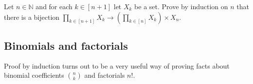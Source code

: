 \begin{exercise}
Let $n \in \mathbb{N}$ and for each $k \in [n+1]$ let $X_k$ be a set. Prove by induction on $n$ that there is a bijection $\displaystyle \prod_{k \in [n+1]} X_k \to \left( \prod_{k \in [n]} X_k \right) \times X_n$.
\end{exercise}

\subsection*{Binomials and factorials}

Proof by induction turns out to be a very useful way of proving facts about binomial coefficients $\binom{n}{k}$ and factorials $n!$.

